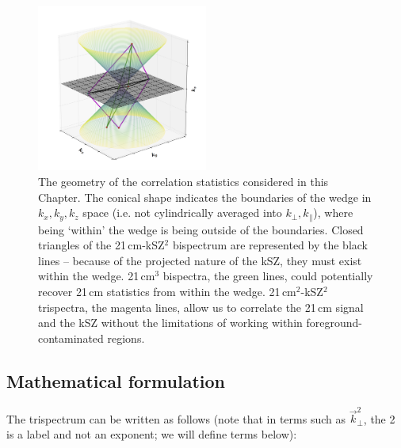 \begin{figure}
\centering
\includegraphics[width=0.5\textwidth]{chapters/ksz_21cm/figures/trispec_and_bispec_3d_fig.png}
\caption[The geometry of the correlation statistics considered in this Chapter.]{The geometry of the correlation statistics considered in this Chapter. The conical shape indicates the boundaries of the wedge in $k_x,k_y,k_z$ space (i.e. not cylindrically averaged into $k_{\perp},k_{\parallel}$), where being `within' the wedge is being outside of the boundaries. Closed triangles of the 21\,cm-kSZ$^2$ bispectrum are represented by the black lines -- because of the projected nature of the kSZ, they must exist within the wedge. 21\,cm$^3$ bispectra, the green lines, could potentially recover 21\,cm statistics from within the wedge. 21\,cm$^2$-kSZ$^2$ trispectra, the magenta lines, allow us to correlate the 21\,cm signal and the kSZ without the limitations of working within foreground-contaminated regions.}
\label{fig:ksz_21cm_correlation_geometries}
\end{figure}

\subsection{Mathematical formulation}

The trispectrum can be written as follows (note that in terms such as $\vec{k}^2_{\perp}$, the 2 is a label and not an exponent; we will define terms below):

